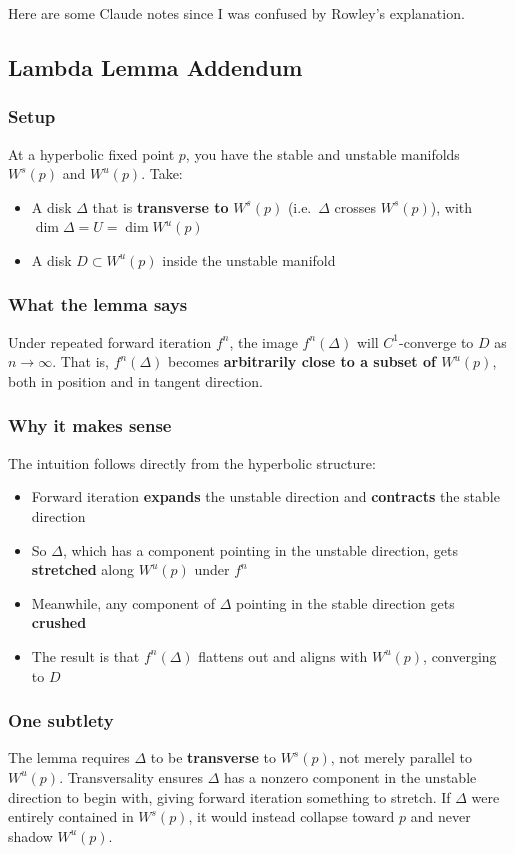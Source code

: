 \documentclass{article}
\begin{document}
\begin{mdframed}
Here are some Claude notes since I was confused by Rowley's explanation.
\subsection*{Lambda Lemma Addendum}
\subsubsection*{Setup}
At a hyperbolic fixed point $p$, you have the stable and unstable manifolds $W^s(p)$ and $W^u(p)$. Take:
\begin{itemize}
    \item A disk $\Delta$ that is \textbf{transverse to} $W^s(p)$ (i.e.\ $\Delta$ crosses $W^s(p)$), with $\dim \Delta = U = \dim W^u(p)$
    \item A disk $D \subset W^u(p)$ inside the unstable manifold
\end{itemize}

\subsubsection*{What the lemma says}
Under repeated forward iteration $f^n$, the image $f^n(\Delta)$ will $C^1$-converge to $D$ as $n \to \infty$. That is, $f^n(\Delta)$ becomes \textbf{arbitrarily close to a subset of $W^u(p)$}, both in position and in tangent direction.

\subsubsection*{Why it makes sense}
The intuition follows directly from the hyperbolic structure:
\begin{itemize}
    \item Forward iteration \textbf{expands} the unstable direction and \textbf{contracts} the stable direction
    \item So $\Delta$, which has a component pointing in the unstable direction, gets \textbf{stretched} along $W^u(p)$ under $f^n$
    \item Meanwhile, any component of $\Delta$ pointing in the stable direction gets \textbf{crushed}
    \item The result is that $f^n(\Delta)$ flattens out and aligns with $W^u(p)$, converging to $D$
\end{itemize}

\subsubsection*{One subtlety}
The lemma requires $\Delta$ to be \textbf{transverse} to $W^s(p)$, not merely parallel to $W^u(p)$. 
Transversality ensures $\Delta$ has a nonzero component in the unstable direction to begin with, 
giving forward iteration something to stretch. If $\Delta$ were entirely contained in $W^s(p)$, 
it would instead collapse toward $p$ and never shadow $W^u(p)$.
\end{mdframed}
\end{document}
